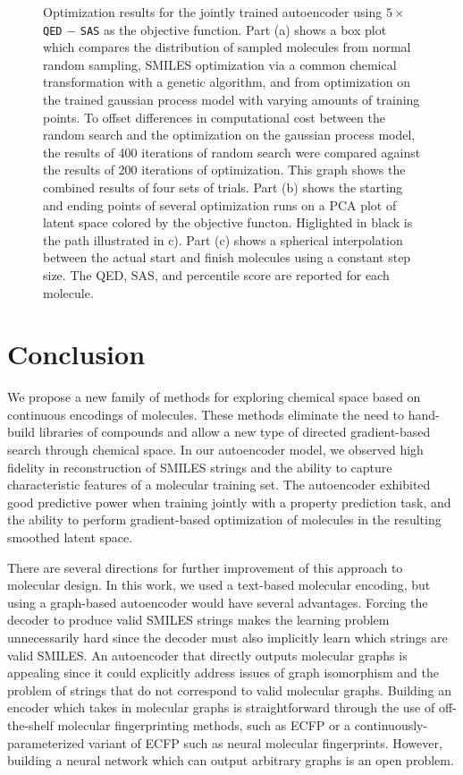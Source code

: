 \begin{figure}
	\caption[Optimization Results in Latent Space]{ Optimization results for the jointly trained autoencoder using $5 \times$ \texttt{QED} $-$ \texttt{SAS} as the objective function. Part (a) shows a box plot which compares the distribution of sampled molecules from normal random sampling, SMILES optimization via a common chemical transformation with a genetic algorithm, and from optimization on the trained gaussian process model with varying amounts of training points. To offset differences in computational cost between the random search and the optimization on the gaussian process model, the results of 400 iterations of random search were compared against the results of 200 iterations of optimization. This graph shows the combined results of four sets of trials. Part (b) shows the starting and ending points of several optimization runs on a PCA plot of latent space colored by the objective functon. Higlighted in black is the path illustrated in c). Part (c) shows a spherical interpolation between the actual start and finish molecules using a constant step size. The QED, SAS, and percentile score are reported for each molecule.}
    \label{fig:optimize_mols}
\end{figure}


\section{Conclusion}
We propose a new family of methods for exploring chemical space based on continuous encodings of molecules.
These methods eliminate the need to hand-build libraries of compounds and allow a new type of directed gradient-based search through chemical space. In our autoencoder model, we observed high fidelity in reconstruction of SMILES strings and the ability to capture characteristic features of a molecular training set. The autoencoder exhibited good predictive power when training jointly with a property prediction task, and the ability to perform gradient-based optimization of molecules in the resulting smoothed latent space. 

There are several directions for further improvement of this approach to molecular design. 
In this work, we used a text-based molecular encoding, but using a graph-based autoencoder would have several advantages.
Forcing the decoder to produce valid SMILES strings makes the learning problem unnecessarily hard since the decoder must also implicitly learn which strings are valid SMILES.
An autoencoder that directly outputs molecular graphs is appealing since it could explicitly address issues of graph isomorphism and the problem of strings that do not correspond to valid molecular graphs. Building an encoder which takes in molecular graphs is straightforward through the use of off-the-shelf molecular fingerprinting methods, such as ECFP\cite{ECFP2010} or a continuously-parameterized variant of ECFP such as neural molecular fingerprints.\cite{duvenaud2015convolutional}
However, building a neural network which can output arbitrary graphs is an open problem. 

